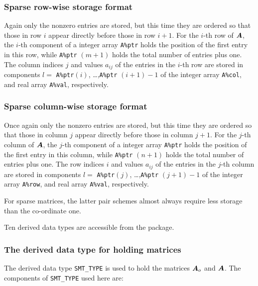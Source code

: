 \documentclass{galahad}
\begin{document}
\subsubsection{Sparse row-wise storage format}\label{rowwise}
Again only the nonzero entries are stored, but this time
they are ordered so that those in row $i$ appear directly before those
in row $i+1$. For the $i$-th row of ${\bm{A}}$, the $i$-th component of a
integer array {\tt A\%ptr} holds the position of the first entry in this row,
while {\tt A\%ptr} $(m+1)$ holds the total number of entries plus one.
The column indices $j$ and values $a_{ij}$ of the entries in the $i$-th row
are stored in components
$l =$ {\tt A\%ptr}$(i)$, \ldots ,{\tt A\%ptr} $(i+1)-1$ of the
integer array {\tt A\%col}, and real array {\tt A\%val}, respectively.

\subsubsection{Sparse column-wise storage format}\label{columnwise}
Once again only the nonzero entries are stored, but this time
they are ordered so that those in column $j$ appear directly before those
in column $j+1$. For the $j$-th column of ${\bm{A}}$, the $j$-th component of a
integer array {\tt A\%ptr} holds the position of the first entry in this column,
while {\tt A\%ptr} $(n+1)$ holds the total number of entries plus one.
The row indices $i$ and values $a_{ij}$ of the entries in the $j$-th column
are stored in components
$l =$ {\tt A\%ptr}$(j)$, \ldots ,{\tt A\%ptr} $(j+1)-1$ of the
integer array {\tt A\%row}, and real array {\tt A\%val}, respectively.

For sparse matrices, the latter pair schemes almost always require less
storage than the co-ordinate one.








\galtypes
Ten derived data types are accessible from the package.


\subsubsection{The derived data type for holding matrices}\label{typesmt}
The derived data type {\tt SMT\_TYPE} is used to hold the matrices ${\bm{A}}_o$
and ${\bm{A}}$.
The components of {\tt SMT\_TYPE} used here are:
\end{document}
